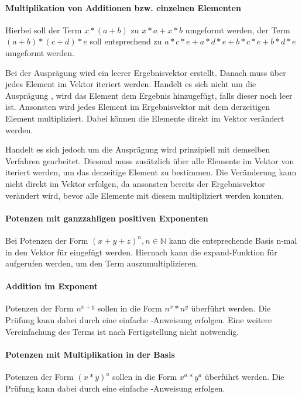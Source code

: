 \documentclass[11pt,a4paper, ngerman]{article}
\begin{document}
\paragraph{Multiplikation von Additionen bzw. einzelnen Elementen} Hierbei soll der Term $x*(a+b)$ zu $x*a+x*b$ umgeformt werden, der Term $(a+b)*(c+d)*e$ soll entsprechend zu $a*c*e + a*d*e + b*c*e + b*d*e$ umgeformt werden.

Bei der Ausprägung  wird ein leerer Ergebnisvektor erstellt. Danach muss über jedes Element im Vektor iteriert werden. Handelt es sich nicht um die Ausprägung , wird das Element dem Ergebnis hinzugefügt, falls dieser noch leer ist. Ansonsten wird jedes Element im Ergebnisvektor mit dem derzeitigen Element multipliziert. Dabei können die Elemente direkt im Vektor verändert werden.

Handelt es sich jedoch um die Ausprägung  wird prinzipiell mit demselben Verfahren gearbeitet. Diesmal muss zusätzlich über alle Elemente im Vektor von  iteriert werden, um das derzeitige Element zu bestimmen. Die Veränderung kann nicht direkt im Vektor erfolgen, da ansonsten bereits der Ergebnisvektor verändert wird, bevor alle Elemente mit diesem multipliziert werden konnten.

\paragraph{Potenzen mit ganzzahligen positiven Exponenten} Bei Potenzen der Form $(x+y+z)^n, n \in \mathbb{N}$ kann die entsprechende Basis n-mal in den Vektor für  eingefügt werden. Hiernach kann die expand-Funktion für  aufgerufen werden, um den Term auszumultiplizieren. 

\paragraph{Addition im Exponent} Potenzen der Form $n^{x+y}$ sollen in die Form $n^x*n^y$ überführt werden. Die Prüfung kann dabei durch eine einfache -Anweisung erfolgen. Eine weitere Vereinfachung des Terms ist nach Fertigstellung nicht notwendig.

\paragraph{Potenzen mit Multiplikation in der Basis} Potenzen der Form $(x*y)^a$ sollen in die Form $x^a*y^a$ überführt werden. Die Prüfung kann dabei durch eine einfache -Anweisung erfolgen.
\end{document}
